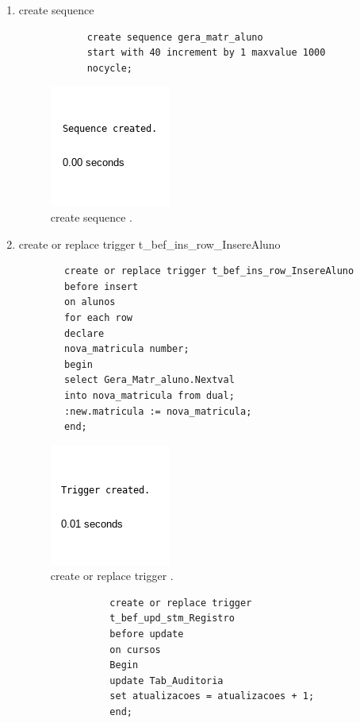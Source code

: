 \documentclass[
article,			%
11pt,				%
oneside,			%
a4paper,			%
english,			%
brazil,				%
sumario=tradicional
]{abntex2}
\begin{document}
\begin{enumerate}
					
							\item create sequence
				\begin{verbatim}
			create sequence gera_matr_aluno
			start with 40 increment by 1 maxvalue 1000
			nocycle;
				\end{verbatim}
				\begin{center}
					\begin{figure}[H]
						\centering
						\includegraphics[scale=0.5]{./imagens/31.png}
						\caption{	create sequence  .}
						\label{rota-1}
					\end{figure}
				\end{center}
								\item 	create or replace trigger t\_bef\_ins\_row\_InsereAluno
			\begin{verbatim}
		create or replace trigger t_bef_ins_row_InsereAluno
		before insert
		on alunos
		for each row
		declare
		nova_matricula number;
		begin
		select Gera_Matr_aluno.Nextval
		into nova_matricula from dual;
		:new.matricula := nova_matricula;
		end;
			\end{verbatim}
			\begin{center}
				\begin{figure}[H]
					\centering
					\includegraphics[scale=0.5]{./imagens/32.png}
					\caption{	create or replace trigger .}
					\label{rota-1}
				\end{figure}
			\end{center}
							\begin{verbatim}
				create or replace trigger
				t_bef_upd_stm_Registro
				before update
				on cursos
				Begin
				update Tab_Auditoria
				set atualizacoes = atualizacoes + 1;
				end;
					\end{verbatim}

\end{enumerate}
\end{document}
